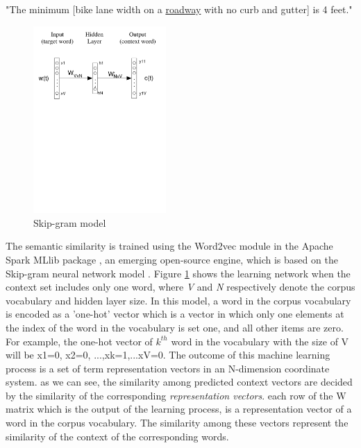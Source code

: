 \documentclass[Journal, BackFigs, DoubleSpace]{ascelike}%
\begin{document}
%
\begin{center}
	"The minimum [bike lane width on a \underline{roadway} with no curb and gutter] is 4 feet."
\end{center}
%
%
\begin{figure}[t]
	\centering
	\includegraphics[width=0.45\textwidth]{Figure4_skip-gram-model}
	\caption{Skip-gram model}
	\label{fig:skip-gram}
\end{figure}
%
The semantic similarity is trained using the Word2vec module in the Apache Spark MLlib package \cite{apache16}, an emerging open-source engine, which is based on the Skip-gram neural network model \cite{mikolov13a}. Figure \ref{fig:skip-gram} shows the learning network when the context set includes only one word, where \textit{V} and \textit{N} respectively denote the corpus vocabulary and hidden layer size. In this model, a word in the corpus vocabulary is encoded as a 'one-hot' vector which is a vector in which only one elements at the index of the word in the vocabulary is set one, and all other items are zero. For example, the one-hot vector of $k^{th}$ word in the vocabulary with the size of V will be {x1=0, x2=0, ...,xk=1,...xV=0}. The outcome of this machine learning process is a set of term representation vectors  in an N-dimension coordinate system. as we can see, the similarity among predicted context vectors are decided by the similarity of the corresponding \textit{representation vectors}. each row of the W matrix which is the output of the learning process, is a representation vector of a word in the corpus vocabulary. The similarity among these vectors represent the similarity of the context of the corresponding words. 
\end{document}
